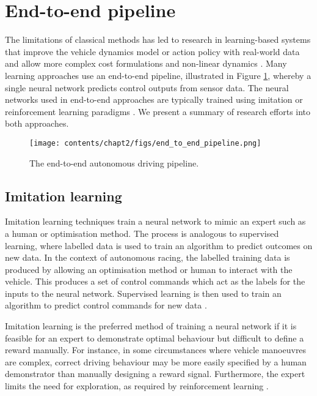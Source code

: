 \section{End-to-end pipeline}
\label{sec:end_to_end}

The limitations of classical methods has led to research in learning-based systems that improve the vehicle dynamics model or action policy with real-world data and allow more complex cost formulations and non-linear dynamics \cite{Fuchs2021}.
Many learning approaches use an end-to-end pipeline, illustrated in Figure \ref{fig:end_to_end}, whereby a single neural network predicts control outputs from sensor data.
The neural networks used in end-to-end approaches are typically trained using imitation or reinforcement learning paradigms \cite{Betz2021}. We present a summary of research efforts into both approaches.

\begin{figure}[h]
    \centering
    \texttt{[image: contents/chapt2/figs/end\_to\_end\_pipeline.png]}
    \caption{The end-to-end autonomous driving pipeline.}
    \label{fig:end_to_end}
\end{figure}

\subsection{Imitation learning}
\label{sec:imitation_learning}

Imitation learning techniques train a neural network to mimic an expert such as a human or optimisation method.
The process is analogous to supervised learning, where labelled data is used to train an algorithm to predict outcomes on new data.
In the context of autonomous racing, the labelled training data is produced by allowing an optimisation method or human to interact with the vehicle.
This produces a set of control commands which act as the labels for the inputs to the neural network.
Supervised learning is then used to train an algorithm to predict control commands for new data \cite{Osa_2018}.

Imitation learning is the preferred method of training a neural network if it is feasible for an expert to demonstrate optimal behaviour but difficult to define a reward manually.
For instance, in some circumstances where vehicle manoeuvres are complex, correct driving behaviour may be more easily specified by a human demonstrator than manually designing a reward signal.
Furthermore, the expert limits the need for exploration, as required by reinforcement learning \cite{Osa_2018}.

